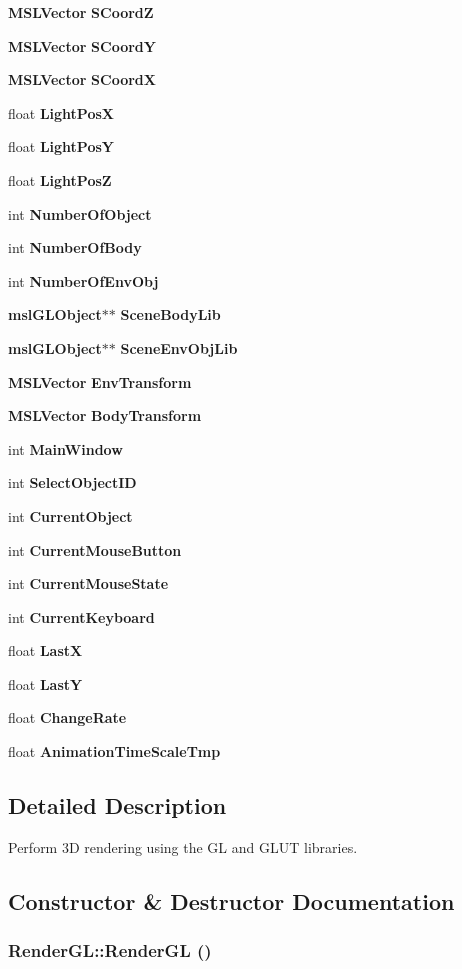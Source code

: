 \begin{CompactItemize}
{\bf MSLVector} {\bf SCoord\-Z}
\item 
{\bf MSLVector} {\bf SCoord\-Y}
\item 
{\bf MSLVector} {\bf SCoord\-X}
\item 
float {\bf Light\-Pos\-X}
\item 
float {\bf Light\-Pos\-Y}
\item 
float {\bf Light\-Pos\-Z}
\item 
int {\bf Number\-Of\-Object}
\item 
int {\bf Number\-Of\-Body}
\item 
int {\bf Number\-Of\-Env\-Obj}
\item 
{\bf msl\-GLObject}$\ast$$\ast$ {\bf Scene\-Body\-Lib}
\item 
{\bf msl\-GLObject}$\ast$$\ast$ {\bf Scene\-Env\-Obj\-Lib}
\item 
{\bf MSLVector} {\bf Env\-Transform}
\item 
{\bf MSLVector} {\bf Body\-Transform}
\item 
int {\bf Main\-Window}
\item 
int {\bf Select\-Object\-ID}
\item 
int {\bf Current\-Object}
\item 
int {\bf Current\-Mouse\-Button}
\item 
int {\bf Current\-Mouse\-State}
\item 
int {\bf Current\-Keyboard}
\item 
float {\bf Last\-X}
\item 
float {\bf Last\-Y}
\item 
float {\bf Change\-Rate}
\item 
float {\bf Animation\-Time\-Scale\-Tmp}
\end{CompactItemize}


\subsection{Detailed Description}
Perform 3D rendering using the GL and GLUT libraries.



\subsection{Constructor \& Destructor Documentation}
\subsubsection{\setlength{\rightskip}{0pt plus 5cm}Render\-GL::Render\-GL ()}\label{class_RenderGL_a0}


